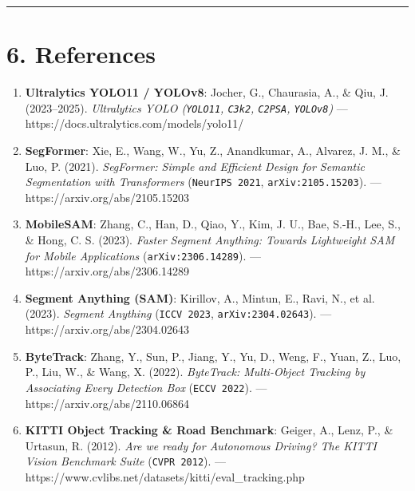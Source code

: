 \documentclass[10.5pt,a4paper]{article}
\begin{document}
\par\noindent\rule{\textwidth}{0.4pt}\par\medskip

\section{6. References}

\begin{enumerate}[leftmargin=1.8em,itemsep=2pt]
\item \textbf{Ultralytics YOLO11 / YOLOv8}: Jocher, G., Chaurasia, A., \& Qiu, J. (2023--2025). \textit{Ultralytics YOLO (\texttt{YOLO11}, \texttt{C3k2}, \texttt{C2PSA}, \texttt{YOLOv8})} --- https:\allowbreak{}/\allowbreak{}/\allowbreak{}docs.\allowbreak{}ultralytics.\allowbreak{}com/\allowbreak{}models/\allowbreak{}yolo11/\allowbreak{}
\item \textbf{SegFormer}: Xie, E., Wang, W., Yu, Z., Anandkumar, A., Alvarez, J. M., \& Luo, P. (2021). \textit{SegFormer: Simple and Efficient Design for Semantic Segmentation with Transformers} (\texttt{NeurIPS 2021}, \texttt{arXiv:\allowbreak{}2105.\allowbreak{}15203}).\allowbreak{} --- https:\allowbreak{}/\allowbreak{}/\allowbreak{}arxiv.\allowbreak{}org/\allowbreak{}abs/\allowbreak{}2105.\allowbreak{}15203
\item \textbf{MobileSAM}: Zhang, C., Han, D., Qiao, Y., Kim, J. U., Bae, S.-H., Lee, S., \& Hong, C. S. (2023). \textit{Faster Segment Anything: Towards Lightweight SAM for Mobile Applications} (\texttt{arXiv:\allowbreak{}2306.\allowbreak{}14289}).\allowbreak{} --- https:\allowbreak{}/\allowbreak{}/\allowbreak{}arxiv.\allowbreak{}org/\allowbreak{}abs/\allowbreak{}2306.\allowbreak{}14289
\item \textbf{Segment Anything (SAM)}: Kirillov, A., Mintun, E., Ravi, N., et al. (2023). \textit{Segment Anything} (\texttt{ICCV 2023}, \texttt{arXiv:\allowbreak{}2304.\allowbreak{}02643}).\allowbreak{} --- https:\allowbreak{}/\allowbreak{}/\allowbreak{}arxiv.\allowbreak{}org/\allowbreak{}abs/\allowbreak{}2304.\allowbreak{}02643
\item \textbf{ByteTrack}: Zhang, Y., Sun, P., Jiang, Y., Yu, D., Weng, F., Yuan, Z., Luo, P., Liu, W., \& Wang, X. (2022). \textit{ByteTrack: Multi-Object Tracking by Associating Every Detection Box} (\texttt{ECCV 2022}).\allowbreak{} --- https:\allowbreak{}/\allowbreak{}/\allowbreak{}arxiv.\allowbreak{}org/\allowbreak{}abs/\allowbreak{}2110.\allowbreak{}06864
\item \textbf{KITTI Object Tracking \& Road Benchmark}: Geiger, A., Lenz, P., \& Urtasun, R. (2012). \textit{Are we ready for Autonomous Driving? The KITTI Vision Benchmark Suite} (\texttt{CVPR 2012}).\allowbreak{} --- https:\allowbreak{}/\allowbreak{}/\allowbreak{}www.\allowbreak{}cvlibs.\allowbreak{}net/\allowbreak{}datasets/\allowbreak{}kitti/\allowbreak{}eval\_\allowbreak{}tracking.\allowbreak{}php

\end{enumerate}
\end{document}

